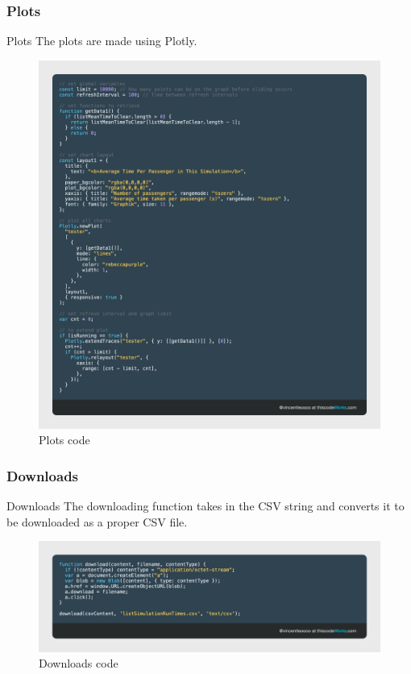 \documentclass{beamer}
\begin{document}
\subsubsection*{Plots}
\begin{frame}{Plots}
	The plots are made using Plotly.
	\begin{figure}
		\includegraphics[scale=0.09]{../img/plotly}\caption{Plots code}
	\end{figure}
\end{frame}

\subsubsection*{Downloads}
\begin{frame}{Downloads}
	The downloading function takes in the CSV string and converts it to be downloaded as a proper CSV file.
	\begin{figure}
		\includegraphics[width=\linewidth]{../img/download-csv}\caption{Downloads code}
	\end{figure}
\end{frame}
\end{document}
